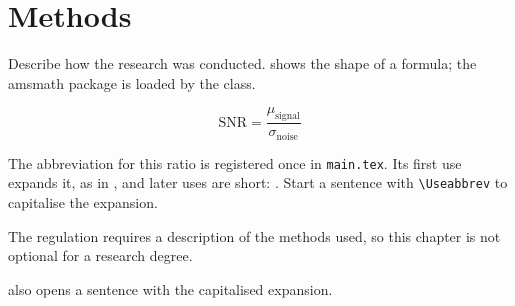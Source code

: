 \chapter{Methods}
Describe how the research was conducted.  shows the shape of a formula; the amsmath package is loaded by the class.

\begin{equation}
  \label{eq:signal-to-noise}
  \mathrm{SNR} = \frac{\mu_{\mathrm{signal}}}{\sigma_{\mathrm{noise}}}
\end{equation}

The abbreviation for this ratio is registered once in \texttt{main.tex}. Its first use expands it, as in , and later uses are short: . Start a sentence with \texttt{\textbackslash Useabbrev} to capitalise the expansion.

The regulation requires a description of the methods used, so this chapter is not optional for a research degree.

 also opens a sentence with the capitalised expansion.






